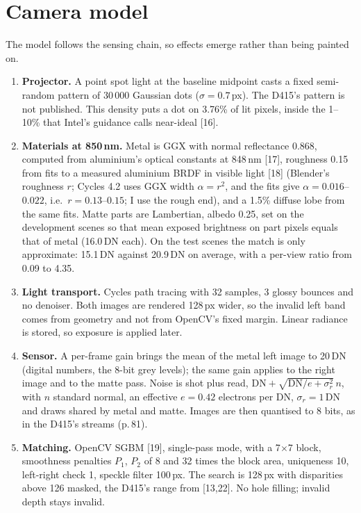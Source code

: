\documentclass[10pt,a4paper]{article}
\newcommand{\cte}[1]{[#1]}
\begin{document}
\section{Camera model}
The model follows the sensing chain, so effects emerge rather than being painted on.
\begin{enumerate}
\item \textbf{Projector.} A point spot light at the baseline midpoint casts a fixed semi-random pattern of 30\,000 Gaussian dots ($\sigma=0.7$\,px). The D415's pattern is not published. This density puts a dot on 3.76\% of lit pixels, inside the 1--10\% that Intel's guidance calls near-ideal \cte{16}.
\item \textbf{Materials at 850\,nm.} Metal is GGX with normal reflectance 0.868, computed from aluminium's optical constants at 848\,nm \cte{17}, roughness 0.15 from fits to a measured aluminium BRDF in visible light \cte{18} (Blender's roughness $r$; Cycles 4.2 uses GGX width $\alpha=r^2$, and the fits give $\alpha=0.016$--$0.022$, i.e.\ $r=0.13$--$0.15$; I use the rough end), and a 1.5\% diffuse lobe from the same fits. Matte parts are Lambertian, albedo 0.25, set on the development scenes so that mean exposed brightness on part pixels equals that of metal (16.0\,DN each). On the test scenes the match is only approximate: 15.1\,DN against 20.9\,DN on average, with a per-view ratio from 0.09 to 4.35.
\item \textbf{Light transport.} Cycles path tracing with 32 samples, 3 glossy bounces and no denoiser. Both images are rendered 128\,px wider, so the invalid left band comes from geometry and not from OpenCV's fixed margin. Linear radiance is stored, so exposure is applied later.
\item \textbf{Sensor.} A per-frame gain brings the mean of the metal left image to 20\,DN (digital numbers, the 8-bit grey levels); the same gain applies to the right image and to the matte pass. Noise is shot plus read, $\mathrm{DN}+\sqrt{\mathrm{DN}/e+\sigma_r^2}\,n$, with $n$ standard normal, an effective $e=0.42$ electrons per DN, $\sigma_r=1$\,DN and draws shared by metal and matte. Images are then quantised to 8 bits, as in the D415's streams (p.\,81).
\item \textbf{Matching.} OpenCV SGBM \cte{19}, single-pass mode, with a 7$\times$7 block, smoothness penalties $P_1$, $P_2$ of 8 and 32 times the block area, uniqueness 10, left-right check 1, speckle filter 100\,px. The search is 128\,px with disparities above 126 masked, the D415's range from \cte{13,22}. No hole filling; invalid depth stays invalid.
\end{enumerate}
\end{document}
